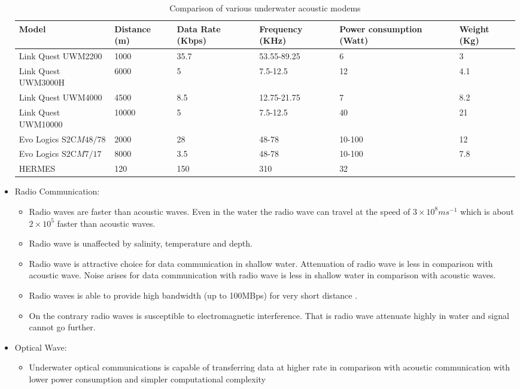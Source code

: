 \documentclass[12pt]{article}
\begin{document}
\begin{itemize}
\begin{table}
  \center
  \begin{tabular}{p{5cm}p{1.3cm}p{1.75cm}p{3.1cm}p{3.3cm}p{1cm}}
  \hline
  Model & Distance (m) & Data Rate (Kbps) & Frequency (KHz) & Power consumption (Watt) & Weight (Kg)\\\hline
  Link Quest UWM2200 \cite{bworld}& 1000 & 35.7&53.55-89.25&6 &3\\
   Link Quest UWM3000H\cite{bworld} & 6000 & 5&7.5-12.5 &12 &4.1\\
    Link Quest UWM4000\cite{bworld} & 4500 & 8.5&12.75-21.75 &7 &8.2\\
     Link Quest UWM10000\cite{bworld} & 10000 & 5&7.5-12.5 &40 &21\\
     Evo Logics S2C$M48/78$\cite{evolo} &2000&28&48-78&10-100&12\\
     Evo Logics S2C$M7/17${\cite{evolo}} &8000&3.5&48-78&10-100&7.8\\
     HERMES\cite{beaujean2008hermes} & 120 &150 & 310 & 32 &\\\hline
  \end{tabular}
  \caption{Comparison of various underwater acoustic modems }
    \label{Tab:AC}
  \end{table}
\item{Radio Communication:} 
\begin{itemize}
\item Radio waves are faster than acoustic waves. Even in the water the radio wave can travel at the speed of $3\times 10^{8} ms^{-1}$ which is about $2\times 10^{5}$ faster than acoustic waves. 
\item Radio wave is unaffected by salinity, temperature and depth.
\item Radio wave is attractive choice for data communication in shallow water. Attenuation of radio wave is less in comparison with acoustic wave\cite{uribe2009radio}\cite{elrashidi2012underwater}. Noise arises for data communication with radio wave is less in shallow water in comparison with acoustic waves.
\item Radio waves is able to provide high bandwidth (up to 100MBps) for very short distance \cite{che2010re}.
\item On the contrary radio waves is susceptible to electromagnetic interference. That is radio wave attenuate highly in water and signal cannot go further.
\end{itemize}
\item {Optical Wave:} 
\begin{itemize}
\item Underwater optical communications is capable of transferring data at higher rate in comparison with acoustic communication with lower power consumption and simpler computational complexity\cite{hanson2008high}\cite{doniec2013end}

\end{itemize}
\end{itemize}
\end{document}

